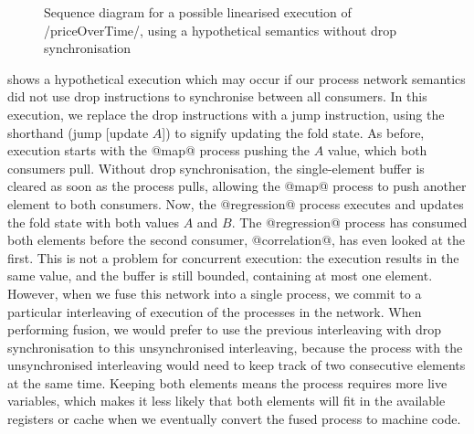 \begin{figure}
\center
\begin{sequencediagram}









\end{sequencediagram}
\caption[Sequence diagram of execution without drop synchronisation]{Sequence diagram for a possible linearised execution of \Hs/priceOverTime/, using a hypothetical semantics without drop synchronisation}
\label{figs/swim/drop/priceOverTime-nosync}
\end{figure}



 shows a hypothetical execution which may occur if our process network semantics did not use drop instructions to synchronise between all consumers.
In this execution, we replace the drop instructions with a jump instruction, using the shorthand (jump [update $A$]) to signify updating the fold state.
As before, execution starts with the @map@ process pushing the $A$ value, which both consumers pull.
Without drop synchronisation, the single-element buffer is cleared as soon as the process pulls, allowing the @map@ process to push another element to both consumers.
Now, the @regression@ process executes and updates the fold state with both values $A$ and $B$.
The @regression@ process has consumed both elements before the second consumer, @correlation@, has even looked at the first.
This is not a problem for concurrent execution: the execution results in the same value, and the buffer is still bounded, containing at most one element.
However, when we fuse this network into a single process, we commit to a particular interleaving of execution of the processes in the network.
When performing fusion, we would prefer to use the previous interleaving with drop synchronisation to this unsynchronised interleaving, because the process with the unsynchronised interleaving would need to keep track of two consecutive elements at the same time.
Keeping both elements means the process requires more live variables, which makes it less likely that both elements will fit in the available registers or cache when we eventually convert the fused process to machine code.

